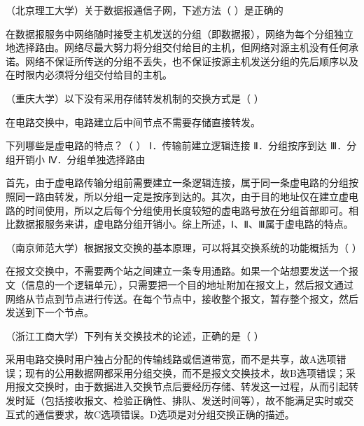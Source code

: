 \question （北京理工大学）关于数据报通信子网，下述方法（ ）是正确的
\par{}
\begin{solution}在数据报服务中网络随时接受主机发送的分组（即数据报），网络为每个分组独立地选择路由。网络尽最大努力将分组交付给目的主机，但网络对源主机没有任何承诺。网络不保证所传送的分组不丢失，也不保证按源主机发送分组的先后顺序以及在时限内必须将分组交付给目的主机。
\end{solution}
\question （重庆大学）以下没有采用存储转发机制的交换方式是（ ）
\par{}
\begin{solution}在电路交换中，电路建立后中间节点不需要存储直接转发。
\end{solution}
\question 下列哪些是虚电路的特点？（ ） Ⅰ．传输前建立逻辑连接 Ⅱ．分组按序到达
Ⅲ．分组开销小 Ⅳ．分组单独选择路由
\par{}
\begin{solution}首先，由于虚电路传输分组前需要建立一条逻辑连接，属于同一条虚电路的分组按照同一路由转发，所以分组一定是按序到达的。其次，由于目的地址仅在建立虚电路的时间使用，所以之后每个分组使用长度较短的虚电路号放在分组首部即可。相比数据报服务来讲，虚电路分组开销小。综上所述，Ⅰ、Ⅱ、Ⅲ属于虚电路的特点。
\end{solution}
\question （南京师范大学）根据报文交换的基本原理，可以将其交换系统的功能概括为（
）
\par{}
\begin{solution}在报文交换中，不需要两个站之间建立一条专用通路。如果一个站想要发送一个报文（信息的一个逻辑单元），只需要把一个目的地址附加在报文上，然后报文通过网络从节点到节点进行传送。在每个节点中，接收整个报文，暂存整个报文，然后发送到下一个节点。
\end{solution}
\question （浙江工商大学）下列有关交换技术的论述，正确的是（ ）
\par{}
\begin{solution}采用电路交换时用户独占分配的传输线路或信道带宽，而不是共享，故A选项错误；现有的公用数据网都采用分组交换，而不是报文交换技术，故B选项错误；采用报文交换时，由于数据进入交换节点后要经历存储、转发这一过程，从而引起转发时延（包括接收报文、检验正确性、排队、发送时间等），故不能满足实时或交互式的通信要求，故C选项错误。D选项是对分组交换正确的描述。
\end{solution}
